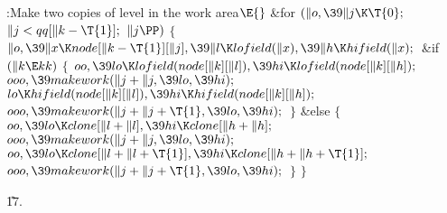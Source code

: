 \Y\B\4:Make two copies of level  in the work area\X${}\E{}$%
\6
\&{for} ${}(\|o,\39\|j\K\T{0};{}$ ${}\|j<\\{qq}[\|k-\T{1}];{}$ ${}\|j\PP){}$\5
${}\{{}$\1\6
${}\|o,\39\|x\K\\{node}[\|k-\T{1}][\|j],\39\|l\K\\{lofield}(\|x),\39\|h\K%
\\{hifield}(\|x);{}$\6
\&{if} ${}(\|k\E\\{kk}){}$\5
${}\{{}$\1\6
${}\\{oo},\39\\{lo}\K\\{lofield}(\\{node}[\|k][\|l]),\39\\{hi}\K\\{lofield}(%
\\{node}[\|k][\|h]);{}$\6
${}\\{ooo},\39\\{makework}(\|j+\|j,\39\\{lo},\39\\{hi});{}$\6
${}\\{lo}\K\\{hifield}(\\{node}[\|k][\|l]),\39\\{hi}\K\\{hifield}(\\{node}[%
\|k][\|h]);{}$\6
${}\\{ooo},\39\\{makework}(\|j+\|j+\T{1},\39\\{lo},\39\\{hi});{}$\6
\4${}\}{}$\5
\2\&{else}\5
${}\{{}$\1\6
${}\\{oo},\39\\{lo}\K\\{clone}[\|l+\|l],\39\\{hi}\K\\{clone}[\|h+\|h];{}$\6
${}\\{ooo},\39\\{makework}(\|j+\|j,\39\\{lo},\39\\{hi});{}$\6
${}\\{oo},\39\\{lo}\K\\{clone}[\|l+\|l+\T{1}],\39\\{hi}\K\\{clone}[\|h+\|h+%
\T{1}];{}$\6
${}\\{ooo},\39\\{makework}(\|j+\|j+\T{1},\39\\{lo},\39\\{hi});{}$\6
\4${}\}{}$\2\6
\4${}\}{}$\2\par
\U17.\fi

